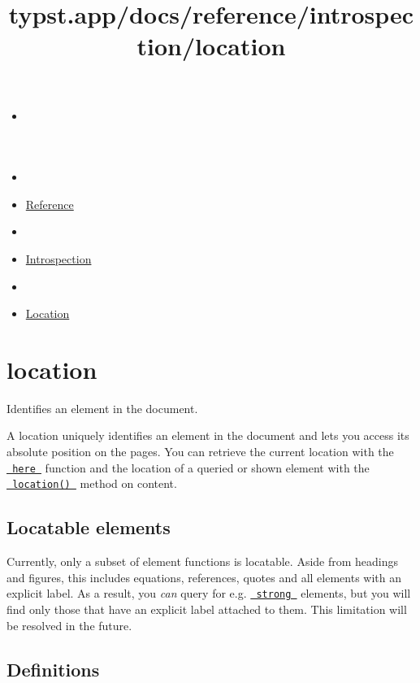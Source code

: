 \title{typst.app/docs/reference/introspection/location}

\begin{itemize}
\tightlist
\item
  \href{/docs}{}
\item
  
\item
  \href{/docs/reference/}{Reference}
\item
  
\item
  \href{/docs/reference/introspection/}{Introspection}
\item
  
\item
  \href{/docs/reference/introspection/location/}{Location}
\end{itemize}

\section{\texorpdfstring{{ location }}{ location }}\label{summary}

Identifies an element in the document.

A location uniquely identifies an element in the document and lets you
access its absolute position on the pages. You can retrieve the current
location with the
\href{/docs/reference/introspection/here/}{\texttt{\ here\ }} function
and the location of a queried or shown element with the
\href{/docs/reference/foundations/content/\#definitions-location}{\texttt{\ location()\ }}
method on content.

\subsection{Locatable elements}\label{locatable}

Currently, only a subset of element functions is locatable. Aside from
headings and figures, this includes equations, references, quotes and
all elements with an explicit label. As a result, you \emph{can} query
for e.g. \href{/docs/reference/model/strong/}{\texttt{\ strong\ }}
elements, but you will find only those that have an explicit label
attached to them. This limitation will be resolved in the future.

\subsection{\texorpdfstring{{ Definitions
}}{ Definitions }}\label{definitions}

